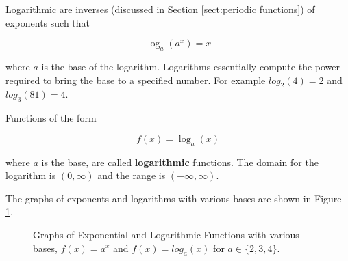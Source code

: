        Logarithmic are inverses (discussed in Section \ref{sect:periodic functions}) of exponents such that

        \begin{equation}
            \log_a(a^x) = x
        \end{equation}

        \noindent where $a$ is the base of the logarithm. Logarithms essentially compute the power required to bring the base to a specified number. For example $log_2(4) = 2$ and $log_3(81) = 4$.

        \begin{definition}
            Functions of the form

            \begin{equation}
                f(x) = \log_a(x)
            \end{equation}

            where $a$ is the base, are called \textbf{logarithmic} functions. The domain for the logarithm is $(0,\infty)$ and the range is $(-\infty,\infty)$.
        \end{definition}

        The graphs of exponents and logarithms with various bases are shown in Figure \ref{fig:exploggraphs}.

        \medskip

        \begin{figure}
            \centering
            \caption{Graphs of Exponential and Logarithmic Functions with various bases, $f(x) = a^x$ and $f(x) = log_a(x)$ for $a \in \{2,3,4\}$.}
            \label{fig:exploggraphs}
        \end{figure}

